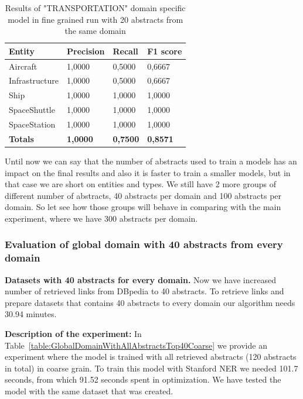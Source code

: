 \documentclass[thesis=M,english]{FITthesis}[2018/05/30]
\begin{document}
	\begin{table}[H]\centering
		\begin{tabular}{|l|l|l|l|}
			\hline {\textbf{Entity}} & {\textbf{Precision}} & {\textbf{Recall}} & {\textbf{F1 score}}\\\hline
				Aircraft & 1,0000 & 0,5000 & 0,6667\\
				Infrastructure & 1,0000 & 0,5000 & 0,6667\\
				Ship & 1,0000 & 1,0000 & 1,0000\\				
				SpaceShuttle & 1,0000 & 1,0000 & 1,0000\\
				SpaceStation & 1,0000 & 1,0000 & 1,0000\\\hline
				\textbf{Totals} & \textbf{1,0000} & \textbf{0,7500} & \textbf{0,8571}\\\hline
		\end{tabular}
		\caption{Results of "TRANSPORTATION" domain specific model in fine grained run with 20 abstracts from the same domain \label{table:TransportationDomainWithTransportationTop20Fine}}			
	\end{table}
	
	Until now we can say that the number of abstracts used to train a models has an impact on the final results and also it is faster to train a smaller models, but in that case we are short on entities and types. We still have 2 more groups of different number of abstracts, 40 abstracts per domain and 100 abstracts per domain. So let see how those groups will behave in comparing with the main experiment, where we have 300 abstracts per domain. 

\subsubsection{Evaluation of global domain with 40 abstracts from every domain }

\textbf{Datasets with 40 abstracts for every domain.} Now we have increased number of retrieved links from DBpedia to 40 abstracts. To retrieve links and prepare datasets that contains 40 abstracts to every domain our algorithm needs 30.94 minutes.

	\textbf{Description of the experiment:} In Table~\ref{table:GlobalDomainWithAllAbstractsTop40Coarse} we provide an experiment where the model is trained with all retrieved abstracts (120 abstracts in total) in coarse grain. To train this model with Stanford NER we needed 101.7 seconds, from which 91.52 seconds spent in optimization. We have tested the model with the same dataset that was created. 
\end{document}
